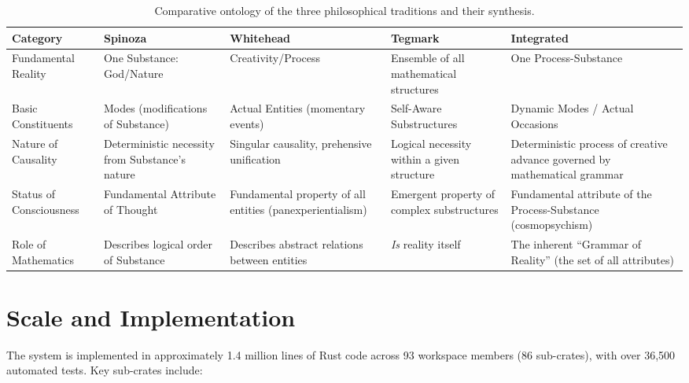 \documentclass[12pt]{book}
\begin{document}
\begin{table}[H]
\centering
\caption{Comparative ontology of the three philosophical traditions and their synthesis.}
\label{tab:kosmic-ontology}
\small
\begin{tabularx}{\textwidth}{lXXXX}
\toprule
\textbf{Category} & \textbf{Spinoza} & \textbf{Whitehead} & \textbf{Tegmark} & \textbf{Integrated} \\
\midrule
Fundamental Reality & One Substance: God/Nature & Creativity/Process & Ensemble of all mathematical structures & One Process-Substance \\
\addlinespace
Basic Constituents & Modes (modifications of Substance) & Actual Entities (momentary events) & Self-Aware Substructures & Dynamic Modes / Actual Occasions \\
\addlinespace
Nature of Causality & Deterministic necessity from Substance's nature & Singular causality, prehensive unification & Logical necessity within a given structure & Deterministic process of creative advance governed by mathematical grammar \\
\addlinespace
Status of Consciousness & Fundamental Attribute of Thought & Fundamental property of all entities (panexperientialism) & Emergent property of complex substructures & Fundamental attribute of the Process-Substance (cosmopsychism) \\
\addlinespace
Role of Mathematics & Describes logical order of Substance & Describes abstract relations between entities & \textit{Is} reality itself & The inherent ``Grammar of Reality'' (the set of all attributes) \\
\bottomrule
\end{tabularx}
\end{table}


\section{Scale and Implementation}

The system is implemented in approximately 1.4 million lines of Rust code across 93 workspace members (86 sub-crates), with over 36,500 automated tests. Key sub-crates include:
\end{document}
